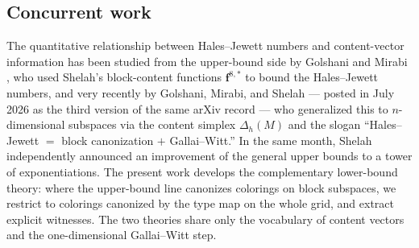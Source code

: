 \documentclass[12pt]{article}
\begin{document}
\subsection*{Concurrent work}
The quantitative relationship between Hales--Jewett numbers and
content-vector information has been studied from the upper-bound side by
Golshani and Mirabi \cite{golshanimirabi2021}, who used Shelah's
block-content functions $\mathbf{f}^{8,*}$ to bound the Hales--Jewett
numbers, and very recently by Golshani, Mirabi, and Shelah
\cite{golshanimirabishelah2026} --- posted in July 2026 as the third
version of the same arXiv record --- who generalized this to
$n$-dimensional subspaces via the content simplex $\Delta_{h}(M)$ and
the slogan ``Hales--Jewett $=$ block canonization $+$ Gallai--Witt.''
In the same month, Shelah \cite{shelah2026revisited} independently
announced an improvement of the general upper bounds to a tower of
exponentiations. The present
work develops the complementary lower-bound theory: where the
upper-bound line canonizes colorings on block subspaces, we restrict to
colorings canonized by the type map on the whole grid, and extract
explicit witnesses. The two theories share only the vocabulary of content
vectors and the one-dimensional Gallai--Witt step.
\end{document}
